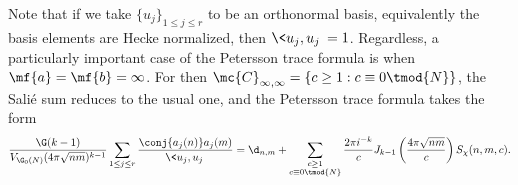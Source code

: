     Note that if we take $\{u_{j}\}_{1 \le j \le r}$ to be an orthonormal basis, equivalently the basis elements are Hecke normalized, then $\<u_{j},u_{j}\> = 1$. Regardless, a particularly important case of the Petersson trace formula is when $\mf{a} = \mf{b} = \infty$. For then $\mc{C}_{\infty,\infty} = \{c \ge 1:c \equiv 0 \tmod{N}\}$, the Sali\'e sum reduces to the usual one, and the Petersson trace formula takes the form
    \[
      \frac{\G(k-1)}{V_{\G_{0}(N)}(4\pi \sqrt{nm})^{k-1}}\sum_{1 \le j \le r}\frac{\conj{a_{j}(n)}a_{j}(m)}{\<u_{j},u_{j}\>} = \d_{n,m}+\sum_{\substack{c \ge 1 \\ c \equiv 0 \tmod{N}}}\frac{2\pi i^{-k}}{c}J_{k-1}\left(\frac{4\pi\sqrt{nm}}{c}\right)S_{\chi}(n,m,c).
    \]